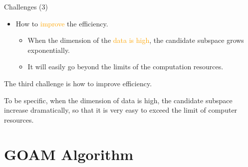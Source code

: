 \documentclass[
 size=14pt,
 paper=smartboard,  %
 mode=present, 		%
 display=slides, 	%
 style=tuliplab,  	%
 pauseslide,
 fleqn,leqno]{powerdot}
\begin{document}
\begin{slide}[toc=,bm=]{Challenges (3)}

\begin{itemize}
\item
How to \textcolor{orange}{improve} the efficiency.

\begin{itemize}

\item
When the dimension of the \textcolor{orange}{data is high},
the candidate subspace grows exponentially.

\item
It will easily go beyond the limits of the computation resources.

\end{itemize}
\end{itemize}

\begin{note}
The third challenge is how to improve efficiency.

To be specific,
when the dimension of data is high,
the candidate subspace increase dramatically,
so that it is very easy to exceed the limit of computer resources.
\end{note}

\end{slide}


\section{GOAM Algorithm}
\end{document}
